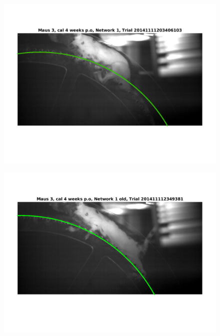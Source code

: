 \documentclass[
	fontsize=12pt,
	paper=a4,
	twoside=false,
	numbers=noenddot,
	plainheadsepline,
	toc=listof,
	toc=bibliography
]{scrartcl}
\begin{document}
\begin{figure} [htb] \centering
	\includegraphics[scale = 0.6]{images/mouse3/result_Maus_3_cal_4_weeks_Network_1_2.png}
\end{figure}
\begin{figure} [htb] \centering
	\includegraphics[scale = 0.6]{images/mouse3/result_Maus_3_cal_4_weeks_Network_1_old.png}
\end{figure}
\end{document}
